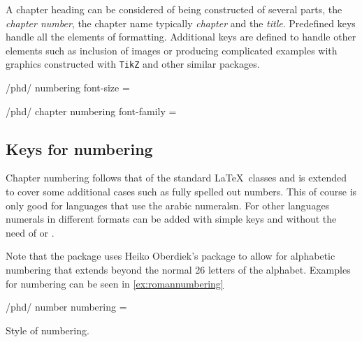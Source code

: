 A chapter heading can be considered of being constructed of several parts, the \textit{chapter number}, the chapter name typically \textit{chapter} and the \textit{title}. Predefined keys handle all the elements of formatting. Additional keys are defined to handle other elements such as inclusion of images or producing complicated examples with graphics constructed with \texttt{TikZ} and other similar packages.

\medskip

\begin{key}{/phd/  numbering font-size = }
\end{key}

\begin{key}{/phd/ chapter numbering font-family = }
\end{key}

\subsection{Keys for numbering}

Chapter numbering follows that of the standard \LaTeX\ classes and is extended to cover some additional cases such as fully spelled out numbers. This of course is only good for languages that use the arabic numeralsn. For other languages numerals in different formats can be added with simple keys and without the need of  or . 

Note that the package uses Heiko Oberdiek's package  to allow for alphabetic numbering that extends beyond the normal 26 letters of the alphabet. Examples for numbering can be seen in \ref{ex:romannumbering}

\medskip

\begin{key}{/phd/ number numbering = }

Style of numbering.
\end{key}

\medskip

